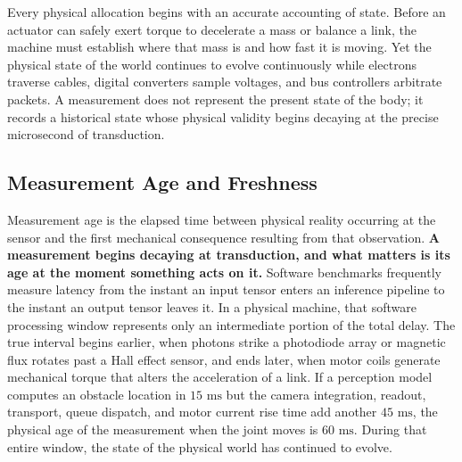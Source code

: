 \documentclass[
  letterpaper,
  DIV=11,
  numbers=noendperiod]{scrartcl}
\begin{document}
Every physical allocation begins with an accurate accounting of state.
Before an actuator can safely exert torque to decelerate a mass or
balance a link, the machine must establish where that mass is and how
fast it is moving. Yet the physical state of the world continues to
evolve continuously while electrons traverse cables, digital converters
sample voltages, and bus controllers arbitrate packets. A measurement
does not represent the present state of the body; it records a
historical state whose physical validity begins decaying at the precise
microsecond of transduction.

\subsection{Measurement Age and Freshness}\label{sec-body-2-2}

Measurement age is the elapsed time between physical reality occurring
at the sensor and the first mechanical consequence resulting from that
observation. \textbf{A measurement begins decaying at transduction, and
what matters is its age at the moment something acts on it.} Software
benchmarks frequently measure latency from the instant an input tensor
enters an inference pipeline to the instant an output tensor leaves it.
In a physical machine, that software processing window represents only
an intermediate portion of the total delay. The true interval begins
earlier, when photons strike a photodiode array or magnetic flux rotates
past a Hall effect sensor, and ends later, when motor coils generate
mechanical torque that alters the acceleration of a link. If a
perception model computes an obstacle location in \(15\text{ ms}\) but
the camera integration, readout, transport, queue dispatch, and motor
current rise time add another \(45\text{ ms}\), the physical age of the
measurement when the joint moves is \(60\text{ ms}\). During that entire
window, the state of the physical world has continued to evolve.
\end{document}
